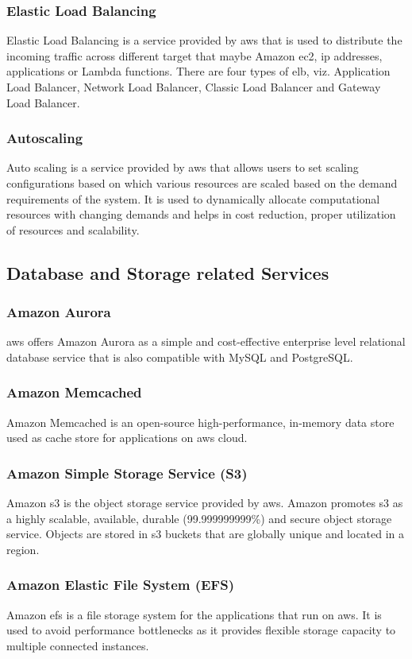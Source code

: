 \documentclass{home_assignment}
\begin{document}
\subsubsection{Elastic Load Balancing}
Elastic Load Balancing is a service provided by \acrshort{aws} that is used to distribute the incoming traffic across different target that maybe Amazon \acrshort{ec2}, \acrshort{ip} addresses, applications or Lambda functions. There are four types of \acrfull{elb}, viz. Application Load Balancer, Network Load Balancer, Classic Load Balancer and Gateway Load Balancer.
\subsubsection{Autoscaling}
Auto scaling is a service provided by \acrshort{aws} that allows users to set scaling configurations based on which various resources are scaled based on the demand requirements of the system. It is used to dynamically allocate computational resources with changing demands and helps in cost reduction, proper utilization of resources and scalability.

\subsection{Database and Storage related Services}
\subsubsection{Amazon Aurora}
\acrshort{aws} offers Amazon Aurora as a simple and cost-effective enterprise level relational database service that is also compatible with MySQL and PostgreSQL.
\subsubsection{Amazon Memcached}
Amazon Memcached is an open-source high-performance, in-memory data store used as cache store for applications on \acrshort{aws} cloud.
\subsubsection{Amazon Simple Storage Service (S3)}
Amazon \acrfull{s3} is the object storage service provided by \acrshort{aws}. Amazon promotes \acrshort{s3} as a highly scalable, available, durable (99.999999999\%) and secure object storage service. Objects are stored in \acrshort{s3} buckets that are globally unique and located in a region. 
\subsubsection{Amazon Elastic File System (EFS)}
Amazon \acrfull{efs} is a file storage system for the applications that run on \acrshort{aws}. It is used to avoid performance bottlenecks as it provides flexible storage capacity to multiple connected instances.
\end{document}
